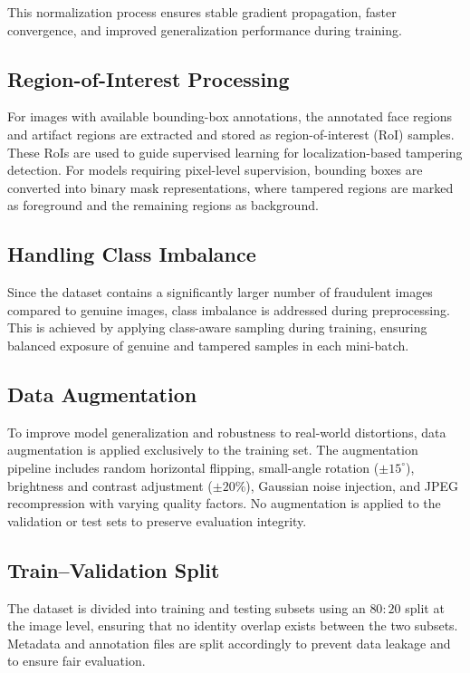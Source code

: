 \documentclass[12pt]{article}
\begin{document}
This normalization process ensures stable gradient propagation, faster convergence,
and improved generalization performance during training.


\subsection{Region-of-Interest Processing}

For images with available bounding-box annotations, the annotated face regions and artifact regions are extracted and stored as region-of-interest (RoI) samples. These RoIs are used to guide supervised learning for localization-based tampering detection. For models requiring pixel-level supervision, bounding boxes are converted into binary mask representations, where tampered regions are marked as foreground and the remaining regions as background.

\subsection{Handling Class Imbalance}

Since the dataset contains a significantly larger number of fraudulent images compared to genuine images, class imbalance is addressed during preprocessing. This is achieved by applying class-aware sampling during training, ensuring balanced exposure of genuine and tampered samples in each mini-batch.

\subsection{Data Augmentation}

To improve model generalization and robustness to real-world distortions, data augmentation is applied exclusively to the training set. The augmentation pipeline includes random horizontal flipping, small-angle rotation ($\pm15^\circ$), brightness and contrast adjustment ($\pm20\%$), Gaussian noise injection, and JPEG recompression with varying quality factors. No augmentation is applied to the validation or test sets to preserve evaluation integrity.

\subsection{Train--Validation Split}

The dataset is divided into training and testing subsets using an $80{:}20$ split at the image level, ensuring that no identity overlap exists between the two subsets. Metadata and annotation files are split accordingly to prevent data leakage and to ensure fair evaluation.
\end{document}
